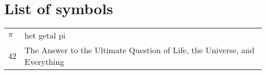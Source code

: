 \documentclass[main_adjusted]{subfiles}
\begin{document}
\chapter*{List of symbols}

\begin{center}
  \begin{tabularx}{0.8\textwidth}{p{1.5cm}X}
    $\pi$ & het getal pi\\
    $42$  & The Answer to the Ultimate Question of Life, the Universe, and Everything\cite{h2g2}
  \end{tabularx}
\end{center}
\end{document}

